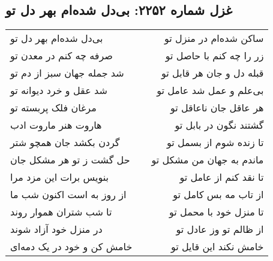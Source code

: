 \begin{center}
\section*{غزل شماره ۲۲۵۲: بی‌دل شده‌ام بهر دل تو}
\label{sec:2252}
\begin{longtable}{l p{0.5cm} r}
بی‌دل شده‌ام بهر دل تو
&&
ساکن شده‌ام در منزل تو
\\
صرفه چه کنم در معدن تو
&&
زر را چه کنم با حاصل تو
\\
شد جمله جهان سبز از دم تو
&&
قبله دل و جان هر قابل تو
\\
شد عقل و خرد دیوانه تو
&&
بی‌علم و عمل شد عامل تو
\\
مرغان فلک پربسته تو
&&
هر عاقل جان ناعاقل تو
\\
هاروت هنر ماروت ادب
&&
گشتند نگون در بابل تو
\\
گردن بکشد جان همچو شتر
&&
تا زنده شوم از بسمل تو
\\
حل گشت ز تو هر مشکل جان
&&
ماندم به جهان من مشکل تو
\\
بنویس برات این مزد مرا
&&
تا نقد کنم از عامل تو
\\
از روز به است اکنون شب ما
&&
از تاب مه بس کامل تو
\\
تا شب شتران هموار روند
&&
تا منزل خود با محمل تو
\\
در منزل خود آزاد شوند
&&
از ظالم تو وز عادل تو
\\
خامش کن و خود در یک دمه‌ای
&&
خامش نکند این قایل تو
\\
\end{longtable}
\end{center}
